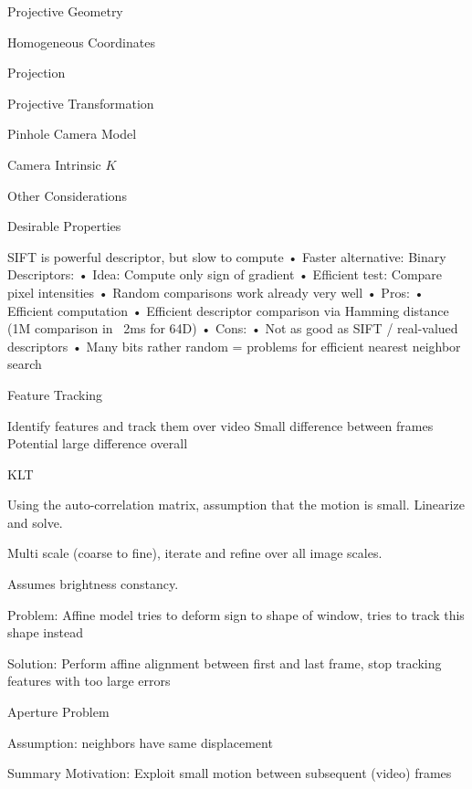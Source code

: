 \begin{section}
\begin{subsubsection}
\begin{subsubsection}
\begin{subsubsection}
\begin{section}{Projective Geometry}
\begin{subsection}{Homogeneous Coordinates}
\begin{subsubsection}
{\begin{subsubsection}{Projection}
\begin{subsubsection}{Projective Transformation}
\begin{subsection}
\begin{subsubsection}
\begin{subsubsection}
\begin{subsubsection}
{\begin{subsubsection}
\begin{subsection}
\begin{subsection} {Pinhole Camera Model}
\begin{subsection} {Camera Intrinsic $K$}
\begin{subsection}
\begin{subsection}
\begin{subsubsection}{Other Considerations}
{\begin{subsection}
\begin{subsubsection}{Desirable Properties}
\begin{section}
\begin{subsection}
\begin{subsection}
\begin{subsection}
\begin{section}
\begin{subsection}
\begin{subsubsection}
\begin{subsubsection}
\begin{subsection}
SIFT is powerful descriptor, but slow to compute
• Faster alternative: Binary Descriptors:
• Idea: Compute only sign of gradient
• Efficient test: Compare pixel intensities
• Random comparisons work already very well
• Pros:
• Efficient computation
• Efficient descriptor comparison via Hamming distance (1M comparison in ~2ms for 64D)
• Cons:
• Not as good as SIFT / real-valued descriptors
• Many bits rather random = problems for efficient nearest neighbor search


\begin{section} Feature Tracking

Identify features and track them over video
Small difference between frames
Potential large difference overall

\begin{subsection} KLT

Using the auto-correlation matrix, assumption that the motion is small.
Linearize and solve.

Multi scale (coarse to fine), iterate and refine over all image scales.

Assumes brightness constancy.

Problem:  Affine model tries to deform sign to shape of window, tries to track this shape instead

Solution: Perform affine alignment between first and last frame, stop tracking features with too large errors

\begin{subsubsection}{Aperture Problem}

Assumption: neighbors have same displacement

\begin{subsubsection} Summary
Motivation: Exploit small motion between subsequent (video) frames


\end{subsubsection}
\end{subsubsection}
\end{subsection}
\end{section}
\end{subsection}
\end{subsubsection}
\end{subsubsection}
\end{subsection}
\end{section}
\end{subsection}
\end{subsection}
\end{subsection}
\end{section}
\end{subsubsection}
\end{subsection}}
\end{subsubsection}
\end{subsection}
\end{subsection}
\end{subsection}
\end{subsection}
\end{subsection}
\end{subsubsection}}
\end{subsubsection}
\end{subsubsection}
\end{subsubsection}
\end{subsection}
\end{subsubsection}
\end{subsubsection}}
\end{subsubsection}
\end{subsection}
\end{section}
\end{subsubsection}
\end{subsubsection}
\end{subsubsection}
\end{section}
